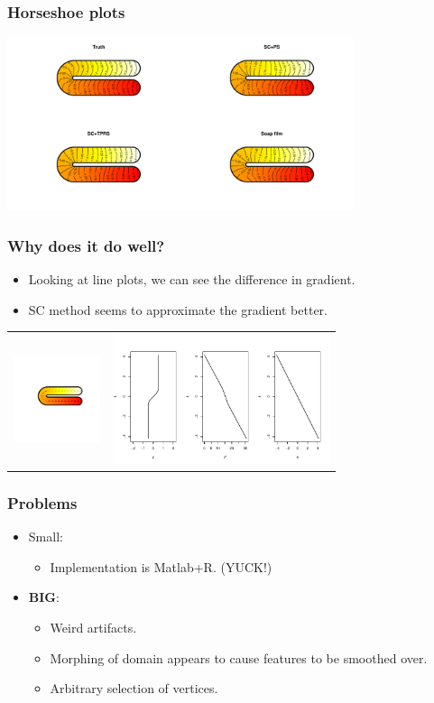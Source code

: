 \documentclass[ignorenonframetext]{beamer} %
\newcommand{\bc}{\begin{center}}
\newcommand{\ec}{\end{center}}
\newcommand{\bi}{\begin{itemize}}
\newcommand{\ei}{\end{itemize}}
\begin{document}
\begin{frame}
	\frametitle{Horseshoe plots}
            \centering
          \includegraphics[width=4in,trim=2in 1in 2in 0.5in]{figs/compsmooth}
\end{frame}

\begin{frame}
	\frametitle{Why does it do well?}
       \bi
         \item Looking at line plots, we can see the difference in gradient.
         \item SC method seems to approximate the gradient better.
       \ei
       \bc\begin{tabular}{c c}
            \centering
          \includegraphics[width=1in, trim=1in 0.75in 0.5in 0.5in]{figs/horseshoecentreline-1} & \includegraphics[width=2.5in]{figs/centrelinelineplots}\\
       \end{tabular}\ec
\end{frame}


\begin{frame}
	\frametitle{Problems}
       \bi
         \item Small:
         \bi
         \item Implementation is Matlab+R. (YUCK!)
         \ei
         \item \textbf{BIG}:
         \bi
         \item Weird artifacts.
         \item Morphing of domain appears to cause features to be smoothed over.
         \item Arbitrary selection of vertices.
         \ei
        \ei
\end{frame}
\end{document}
